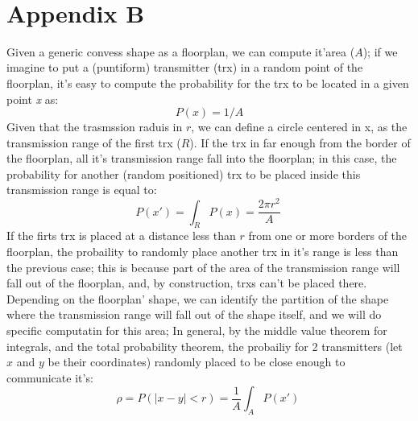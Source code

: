 %
\\
\section*{Appendix B}
Given a generic convess shape as a floorplan, we can compute it'area ($A$); 
if we imagine to put a (puntiform) transmitter (trx) in a random point of the floorplan, 
it's easy to compute the probability for the trx to be located in a given 
point \textit{x} as:
\begin{equation*}
  P(x)=1/A
\end{equation*}
Given that the trasmssion raduis in $r$, we can define a circle centered in x, 
as the transmission range of the first trx ($R$). If the trx in far enough from 
the border of the floorplan, all it's transmission range fall into the floorplan; 
in this case, the probability for another (random positioned) trx to be placed 
inside this transmission range is equal to:
\begin{equation*}
  P(x') = \int_{R}^{} P(x)= \frac{2\pi r^2}{A} \ 
\end{equation*}
If the firts trx is placed at a distance less than $r$ from one or more borders of the floorplan,
the probaility to randomly place another trx in it's range is less than the previous case; this is 
because part of the area of the transmission range will fall out of the floorplan, and,
by construction, trxs can't be placed there. 
Depending on the floorplan' shape, we can identify the partition of the shape where the transmission range
will fall out of the shape itself, and we will do specific computatin for this area;
In general, by the middle value theorem for integrals, and the total probability theorem, the probailiy
for 2 transmitters (let $x$ and $y$ be their coordinates) randomly placed to be close enough to communicate it's:
\begin{equation*}
  \rho =P(|x-y|<r) = \frac{1}{A} \int_{A}^{} P(x') \ 
\end{equation*}
